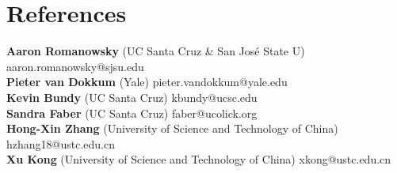 \documentclass[letterpaper,11pt]{article}
\begin{document}
\section{References}
{\bf Aaron Romanowsky} (UC Santa Cruz \& San Jos\'e State U) \hfill {aaron.romanowsky@sjsu.edu}\\
\vspace{0.1cm}
{\bf Pieter van Dokkum} (Yale) \hfill {pieter.vandokkum@yale.edu}\\
\vspace{0.1cm}
{\bf Kevin Bundy} (UC Santa Cruz) \hfill {kbundy@ucsc.edu}\\
\vspace{0.1cm}
{\bf Sandra Faber} (UC Santa Cruz) \hfill {faber@ucolick.org}\\
\vspace{0.1cm}
{\bf Hong-Xin Zhang} (University of Science and Technology of China) \hfill {hzhang18@ustc.edu.cn}\\
\vspace{0.1cm}
{\bf Xu Kong} (University of Science and Technology of China) \hfill {xkong@ustc.edu.cn}
\end{document}
